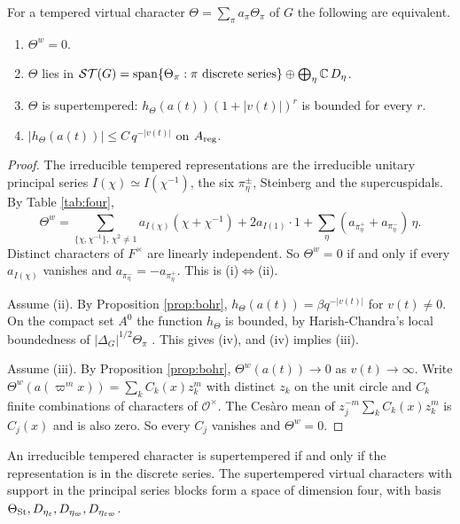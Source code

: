 \begin{theorem}\label{thm:herb-rank-one}For a tempered virtual character $\Theta=\sum_\pi a_\pi\Theta_\pi$ of $G$ the following are equivalent.
\begin{enumerate}[label=(\roman*),leftmargin=*]
\item $\Theta^w=0$.
\item $\Theta$ lies in $\mathcal{ST}(G)=\operatorname{span}\{\Theta_\pi:\pi\text{ discrete series}\}\oplus\bigoplus_{\eta}\mathbb C\,D_\eta$.
\item $\Theta$ is supertempered: $h_\Theta(a(t))(1+|v(t)|)^r$ is bounded for every $r$.
\item $|h_\Theta(a(t))|\le C\,q^{-|v(t)|}$ on $A_{\rm reg}$.
\end{enumerate}
\end{theorem}
\begin{proof}
The irreducible tempered representations are the irreducible unitary principal series $I(\chi)\simeq I(\chi^{-1})$, the six $\pi_\eta^\pm$, Steinberg and the supercuspidals. By Table \ref{tab:four},
\[
\Theta^w=\sum_{\{\chi,\chi^{-1}\},\,\chi^2\ne1}a_{I(\chi)}(\chi+\chi^{-1})+2a_{I(1)}\cdot1+\sum_\eta(a_{\pi_\eta^+}+a_{\pi_\eta^-})\,\eta .
\]
Distinct characters of $F^\times$ are linearly independent. So $\Theta^w=0$ if and only if every $a_{I(\chi)}$ vanishes and $a_{\pi_\eta^-}=-a_{\pi_\eta^+}$. This is (i)$\Leftrightarrow$(ii).

Assume (ii). By Proposition \ref{prop:bohr}, $h_\Theta(a(t))=\beta q^{-|v(t)|}$ for $v(t)\ne0$. On the compact set $A^0$ the function $h_\Theta$ is bounded, by Harish-Chandra's local boundedness of $|\Delta_G|^{1/2}\Theta_\pi$ \cite{HC99}. This gives (iv), and (iv) implies (iii).

Assume (iii). By Proposition \ref{prop:bohr}, $\Theta^w(a(t))\to0$ as $v(t)\to\infty$. Write $\Theta^w(a(\varpi^mx))=\sum_kC_k(x)z_k^m$ with distinct $z_k$ on the unit circle and $C_k$ finite combinations of characters of $\mathcal O^\times$. The Ces\`aro mean of $z_j^{-m}\sum_kC_k(x)z_k^m$ is $C_j(x)$ and is also zero. So every $C_j$ vanishes and $\Theta^w=0$.
\end{proof}

\begin{corollary}\label{cor:irr}An irreducible tempered character is supertempered if and only if the representation is in the discrete series. The supertempered virtual characters with support in the principal series blocks form a space of dimension four, with basis $\Theta_{\operatorname{St}},D_{\eta_\varepsilon},D_{\eta_\varpi},D_{\eta_{\varepsilon\varpi}}$.
\end{corollary}

